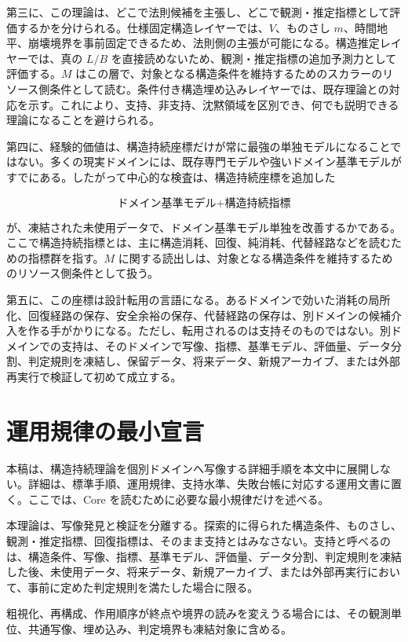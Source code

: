 \documentclass[12pt,a4paper]{article}
\begin{document}
第三に、この理論は、どこで法則候補を主張し、どこで観測・推定指標として評価するかを分けられる。仕様固定構造レイヤーでは、\(V\)、ものさし \(m\)、時間地平、崩壊境界を事前固定できるため、法則側の主張が可能になる。構造推定レイヤーでは、真の \(L/B\) を直接読めないため、観測・推定指標の追加予測力として評価する。\(M\) はこの層で、対象となる構造条件を維持するためのスカラーのリソース側条件として読む。条件付き構造埋め込みレイヤーでは、既存理論との対応を示す。これにより、支持、非支持、沈黙領域を区別でき、何でも説明できる理論になることを避けられる。

第四に、経験的価値は、構造持続座標だけが常に最強の単独モデルになることではない。多くの現実ドメインには、既存専門モデルや強いドメイン基準モデルがすでにある。したがって中心的な検査は、構造持続座標を追加した

\[
\text{ドメイン基準モデル}+\text{構造持続指標}
\]

が、凍結された未使用データで、ドメイン基準モデル単独を改善するかである。ここで構造持続指標とは、主に構造消耗、回復、純消耗、代替経路などを読むための指標群を指す。\(M\) に関する読出しは、対象となる構造条件を維持するためのリソース側条件として扱う。

第五に、この座標は設計転用の言語になる。あるドメインで効いた消耗の局所化、回復経路の保存、安全余裕の保存、代替経路の保存は、別ドメインの候補介入を作る手がかりになる。ただし、転用されるのは支持そのものではない。別ドメインでの支持は、そのドメインで写像、指標、基準モデル、評価量、データ分割、判定規則を凍結し、保留データ、将来データ、新規アーカイブ、または外部再実行で検証して初めて成立する。

\section{運用規律の最小宣言}\label{ux904bux7528ux898fux5f8bux306eux6700ux5c0fux5ba3ux8a00}

本稿は、構造持続理論を個別ドメインへ写像する詳細手順を本文中に展開しない。詳細は、標準手順、運用規律、支持水準、失敗台帳に対応する運用文書に置く。ここでは、Core を読むために必要な最小規律だけを述べる。

本理論は、写像発見と検証を分離する。探索的に得られた構造条件、ものさし、観測・推定指標、回復指標は、そのまま支持とはみなさない。支持と呼べるのは、構造条件、写像、指標、基準モデル、評価量、データ分割、判定規則を凍結した後、未使用データ、将来データ、新規アーカイブ、または外部再実行において、事前に定めた判定規則を満たした場合に限る。

粗視化、再構成、作用順序が終点や境界の読みを変えうる場合には、その観測単位、共通写像、埋め込み、判定境界も凍結対象に含める。
\end{document}
